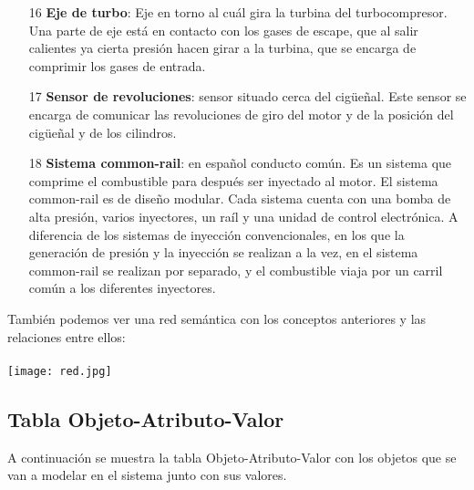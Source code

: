\documentclass[a4paper,12pt]{article}
\begin{document}
\begin{itemize}
\item[16] \textbf{Eje de turbo}: Eje en torno al cuál gira la turbina del turbocompresor. Una parte de eje está en contacto con los gases de escape, que al salir calientes ya cierta presión hacen girar a la turbina, que se encarga de comprimir los gases de entrada.
\item[17] \textbf{Sensor de revoluciones}: sensor situado cerca del cig\"ue\~nal. Este sensor se encarga de comunicar las revoluciones de giro del motor y de la posición del cig\"ue\~nal y de los cilindros.
\item[18] \textbf{Sistema common-rail}: en español conducto común. Es un sistema que comprime el combustible para después ser inyectado al motor. El sistema common-rail es de diseño modular. Cada sistema cuenta con una bomba de alta presión, varios inyectores, un raíl y una unidad de control electrónica. A diferencia de los sistemas de inyección convencionales, en los que la generación de presión y la inyección se realizan a la vez, en el sistema common-rail se realizan por separado, y el combustible viaja por un carril común a los diferentes inyectores.
\end{itemize}

También podemos ver una red semántica con los conceptos anteriores y las relaciones entre ellos:\\\\
\texttt{[image: red.jpg]}

\newpage
\subsection{Tabla Objeto-Atributo-Valor}
A continuación se muestra la tabla Objeto-Atributo-Valor con los objetos que se van a modelar en el sistema junto con sus valores.
\end{document}
